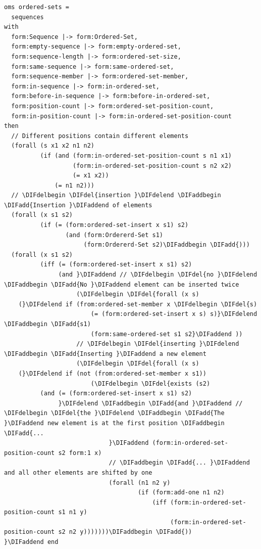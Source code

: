 \documentclass[10pt,fleqn,final]{scrreprt}
\newenvironment{definitions}[0]{\medskip }{}
\providecommand{\DIFadd}[1]{{\protect\color{blue}\uwave{#1}}} %
\providecommand{\DIFdel}[1]{{\protect\color{red}\sout{#1}}}                      %
\providecommand{\DIFaddbegin}{} %
\providecommand{\DIFaddend}{} %
\providecommand{\DIFdelbegin}{} %
\providecommand{\DIFdelend}{} %
\begin{document}
\begin{definitions}
\begin{lstlisting}
oms ordered-sets =
  sequences
with
  form:Sequence |-> form:Ordered-Set,
  form:empty-sequence |-> form:empty-ordered-set,
  form:sequence-length |-> form:ordered-set-size,
  form:same-sequence |-> form:same-ordered-set,
  form:sequence-member |-> form:ordered-set-member,
  form:in-sequence |-> form:in-ordered-set,
  form:before-in-sequence |-> form:before-in-ordered-set,
  form:position-count |-> form:ordered-set-position-count,
  form:in-position-count |-> form:in-ordered-set-position-count
then
  // Different positions contain different elements
  (forall (s x1 x2 n1 n2)
          (if (and (form:in-ordered-set-position-count s n1 x1)
                   (form:in-ordered-set-position-count s n2 x2)
                   (= x1 x2))
              (= n1 n2)))
  // \DIFdelbegin \DIFdel{insertion }\DIFdelend \DIFaddbegin \DIFadd{Insertion }\DIFaddend of elements
  (forall (x s1 s2)
          (if (= (form:ordered-set-insert x s1) s2)
                 (and (form:Ordererd-Set s1)
                      (form:Ordererd-Set s2)\DIFaddbegin \DIFadd{)))
  (forall (x s1 s2)
          (iff (= (form:ordered-set-insert x s1) s2)
               (and }\DIFaddend // \DIFdelbegin \DIFdel{no }\DIFdelend \DIFaddbegin \DIFadd{No }\DIFaddend element can be inserted twice
                    (\DIFdelbegin \DIFdel{forall (x s)
    (}\DIFdelend if (from:ordered-set-member x \DIFdelbegin \DIFdel{s)
                        (= (form:ordered-set-insert x s) s)}\DIFdelend \DIFaddbegin \DIFadd{s1)
                        (form:same-ordered-set s1 s2}\DIFaddend ))
                    // \DIFdelbegin \DIFdel{inserting }\DIFdelend \DIFaddbegin \DIFadd{Inserting }\DIFaddend a new element
                    (\DIFdelbegin \DIFdel{forall (x s)
    (}\DIFdelend if (not (from:ordered-set-member x s1))
                        (\DIFdelbegin \DIFdel{exists (s2)
          (and (= (form:ordered-set-insert x s1) s2)     
               }\DIFdelend \DIFaddbegin \DIFadd{and }\DIFaddend // \DIFdelbegin \DIFdel{the }\DIFdelend \DIFaddbegin \DIFadd{The }\DIFaddend new element is at the first position \DIFaddbegin \DIFadd{...
                             }\DIFaddend (form:in-ordered-set-position-count s2 form:1 x)
                             // \DIFaddbegin \DIFadd{... }\DIFaddend and all other elements are shifted by one
                             (forall (n1 n2 y)
                                     (if (form:add-one n1 n2)
                                         (iff (form:in-ordered-set-position-count s1 n1 y)
                                              (form:in-ordered-set-position-count s2 n2 y)))))))\DIFaddbegin \DIFadd{))
}\DIFaddend end


\end{lstlisting}
\end{definitions}
\end{document}
